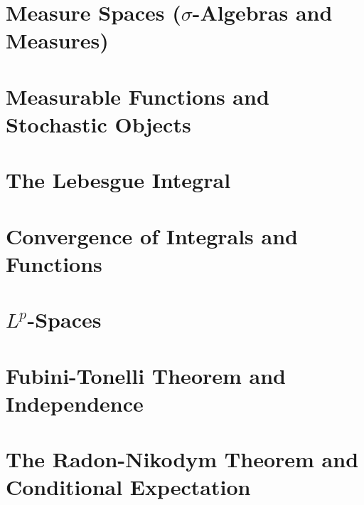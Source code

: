 \documentclass{lecturenotes}
\begin{document}
\chapter{Measure Spaces ($\sigma$-Algebras and Measures)}
\label{chapter:sigma_algebras}


\chapter{Measurable Functions and Stochastic Objects}
\label{chapter:measurable_functions}


\chapter{The Lebesgue Integral}
\label{chapter:integration}


\chapter{Convergence of Integrals and Functions}
\label{chapter:convergence}


\chapter{$L^p$-Spaces}
\label{chapter:lp_spaces}


\chapter{Fubini-Tonelli Theorem and Independence}
\label{chapter:fubini-tonelli}


\chapter{The Radon-Nikodym Theorem and Conditional Expectation}
\label{chapter:radon-nikodym}



%
%

%
\end{document}
